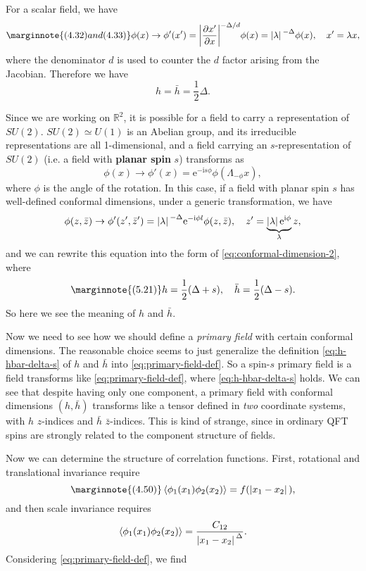 \documentclass[hyperref, a4paper]{article}
\newcommand*{\ii}{\mathrm{i}}
\newcommand*{\ee}{\mathrm{e}}
\newcommand*{\concept}[1]{{\textbf{#1}}}
\begin{document}
For a scalar field, we have 
\begin{equation} \marginnote{(4.32) and (4.33)}
    \phi(x) \to \phi'(x') = \abs{\pdv{x'}{x}}^{- \Delta / d} \phi(x) = \abs*{\lambda}^{- \Delta} \phi(x), \quad x' = \lambda x, 
\end{equation}
where the denominator $d$ is used to counter the $d$ factor arising from the Jacobian. Therefore we have 
\begin{equation}
    h = \bar{h} = \frac{1}{2} \Delta.
\end{equation}

Since we are working on $\mathbb{R}^2$, it is possible for a field to carry a representation of $SU(2)$.
$SU(2) \simeq U(1)$ is an Abelian group, and its irreducible representations are all 1-dimensional, and 
a field carrying an $s$-representation of $SU(2)$ (i.e. a field with \concept{planar spin} $s$) transforms as 
\begin{equation}
    \phi(x) \to \phi'(x) = \ee^{- \ii s \phi} \phi(\Lambda_{- \phi} x) ,
\end{equation} %
where $\phi$ is the angle of the rotation. In this case, if a field with planar spin $s$ has well-defined conformal 
dimensions, under a generic transformation, we have 
\begin{equation}
    \phi(z, \bar{z}) \to \phi'(z', \bar{z}') = \abs*{\lambda}^{- \Delta} \ee^{- \ii \phi l} \phi(z, \bar{z}), \quad z' = \underbrace{\abs*{\lambda} \ee^{\ii \phi}}_\lambda z,
\end{equation}
and we can rewrite this equation into the form of \eqref{eq:conformal-dimension-2}, where 
\begin{equation} \marginnote{(5.21)}
    h = \frac{1}{2} (\Delta + s), \quad \bar{h} = \frac{1}{2}(\Delta - s).
    \label{eq:h-hbar-delta-s}
\end{equation}
So here we see the meaning of $h$ and $\bar{h}$. 

Now we need to see how we should define a \emph{primary field} with certain conformal dimensions. 
The reasonable choice seems to just generalize the definition \eqref{eq:h-hbar-delta-s} of $h$ and $\bar{h}$ 
into \eqref{eq:primary-field-def}. %
So a spin-$s$ primary field is a field transforms like \eqref{eq:primary-field-def}, where \eqref{eq:h-hbar-delta-s} holds.
We can see that despite having only one component, a primary field with conformal dimensions $(h, \bar{h})$
transforms like a tensor defined in \emph{two} coordinate systems, with $h$ $z$-indices and $\bar{h}$ $\bar{z}$-indices. 
This is kind of strange, since in ordinary QFT spins are strongly related to the component structure of fields.

Now we can determine the structure of correlation functions. First, rotational and translational invariance require 
\[ \marginnote{(4.50)}
    \expval{\phi_1(x_1) \phi_2(x_2)} = f(\abs*{x_1 - x_2}),
\]
and then scale invariance requires 
\[
    \expval{\phi_1(x_1) \phi_2(x_2)} = \frac{C_{12}}{\abs*{x_1 - x_2}^\Delta}.
\]
Considering \eqref{eq:primary-field-def}, we find 



\end{document}
